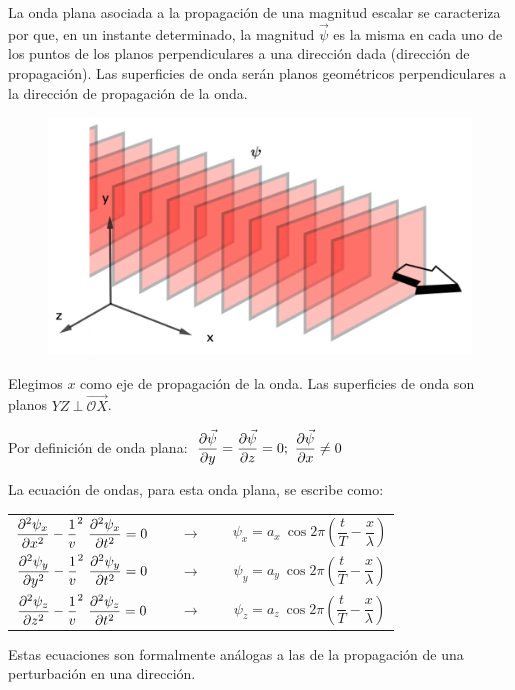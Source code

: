 La onda plana asociada a la propagación de una magnitud escalar se caracteriza por que, en un instante determinado, la magnitud $\vec \psi$ es la misma en cada uno de los puntos de los planos perpendiculares  a una dirección dada (dirección de propagación). Las superficies de onda serán planos geométricos perpendiculares a la dirección de propagación de la onda.
	\begin{figure}[H]
		\centering
		\includegraphics[width=.8\textwidth]{imagenes/imagenes21/T21IM04.png}
	\end{figure}
\vspace{40mm}  %
Elegimos $x$ como eje de propagación de la onda. Las superficies de onda son planos $YZ\ \bot \ \overrightarrow{\mathcal OX}$.

Por definición de onda plana: $\ \displaystyle \pdv{\vec \psi}{y}=\pdv{\vec \psi}{z}=0;\ \pdv{\vec \psi}{x}\neq 0$

La ecuación de ondas, para esta onda plana, se escribe como:

\begin{table}[H]
\begin{tabular}{ccc}
$\displaystyle \pdv[2]{\psi_x}{x}-\dfrac 1 v^2\ \pdv[2]{\psi_x}{t}=0\quad $ &$ \ \to \ $&$\displaystyle \quad \psi_x=a_x\ \cos 2 \pi \left( \dfrac t T - \dfrac x \lambda \right)$  \\
$\displaystyle \pdv[2]{\psi_y}{y}-\dfrac 1 v^2\ \pdv[2]{\psi_y}{t}=0\quad $ &$ \ \to \ $&$\displaystyle \quad \psi_y=a_y\ \cos 2 \pi  \left( \dfrac t T - \dfrac x \lambda \right)$  \\
$\displaystyle \pdv[2]{\psi_z}{z}-\dfrac 1 v^2\ \pdv[2]{\psi_z}{t}=0\quad $ &$ \ \to \ $&$\displaystyle \quad \psi_z=a_z\ \cos 2 \pi  \left( \dfrac t T - \dfrac x \lambda \right)$  
\end{tabular}
\end{table}

Estas ecuaciones son formalmente análogas a las de la propagación de una perturbación en una dirección.

